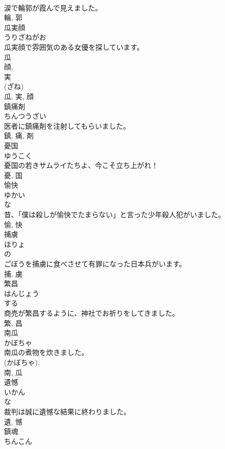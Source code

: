 \documentclass[8pt]{extreport}
\begin{document}
\begin{CJK}{UTF8}{min}
\\	涙で輪郭が霞んで見えました。	
\\	輪, 郭	
\\	瓜実顔	
\\	うりざねがお	
\\	瓜実顔で雰囲気のある女優を探しています。	
\\	瓜 
\\	顔, 
\\	実 
\\	(ざね) 
\\	瓜, 実, 顔	
\\	鎮痛剤	
\\	ちんつうざい	
\\	医者に鎮痛剤を注射してもらいました。	
\\	鎮, 痛, 剤	
\\	憂国	
\\	ゆうこく	
\\	憂国の若きサムライたちよ、今こそ立ち上がれ！	
\\	憂, 国	
\\	愉快	
\\	ゆかい	
\\	な 
\\	昔、「僕は殺しが愉快でたまらない」と言った少年殺人犯がいました。	
\\	愉, 快	
\\	捕虜	
\\	ほりょ	
\\	の 
\\	ごぼうを捕虜に食べさせて有罪になった日本兵がいます。	
\\	捕, 虜	
\\	繁昌	
\\	はんじょう	
\\	する 
\\	商売が繁昌するように、神社でお祈りをしてきました。	
\\	繁, 昌	
\\	南瓜	
\\	かぼちゃ	
\\	南瓜の煮物を炊きました。	
\\	(かぼちゃ). 
\\	南, 瓜	
\\	遺憾	
\\	いかん	
\\	な 
\\	裁判は誠に遺憾な結果に終わりました。	
\\	遺, 憾	
\\	鎮魂	
\\	ちんこん	

\end{CJK}
\end{document}
